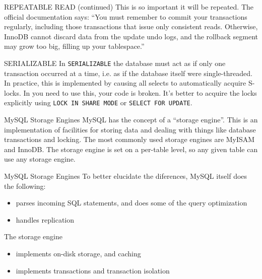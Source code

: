 \documentclass[14pt]{beamer}
\begin{document}
\begin{frame}{REPEATABLE READ (continued)}
  This is so important it will be repeated. The official documentation says:
  \newline
  \newline
  ``You must remember to commit your transactions regularly, including those
  transactions that issue only consistent reads. Otherwise, InnoDB cannot
  discard data from the update undo logs, and the rollback segment may grow too
  big, filling up your tablespace.''
\end{frame}

\begin{frame}{SERIALIZABLE}
  In \texttt{SERIALIZABLE} the database must act as if only one transaction
  occurred at a time, i.e. as if the database itself were single-threaded. In
  practice, this is implemented by causing all selects to automatically acquire
  S-locks.
  \newline
  \newline
  In you need to use this, your code is broken. It's better to acquire the locks
  explicitly using \texttt{LOCK IN SHARE MODE} or \texttt{SELECT FOR UPDATE}.

\end{frame}


\begin{frame}{MySQL Storage Engines}
  MySQL has the concept of a ``storage engine''. This is an implementation of
  facilities for storing data and dealing with things like database transactions
  and locking.
  \newline
  \newline
  The most commonly used storage engines are MyISAM and InnoDB. The storage
  engine is set on a per-table level, so any given table can use any storage
  engine.
\end{frame}

\begin{frame}{MySQL Storage Engines}
  To better elucidate the diferences, MySQL itself does the following:
  \begin{itemize}
    \item parses incoming SQL statements, and does some of the query optimization
    \item handles replication
  \end{itemize}
  The storage engine
  \begin{itemize}
    \item implements on-disk storage, and caching
    \item implements transactions and transaction isolation
  \end{itemize}
\end{frame}
\end{document}
